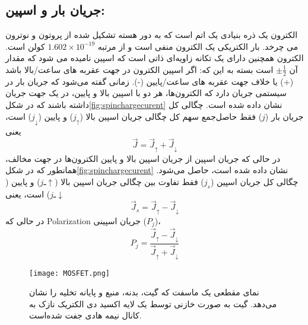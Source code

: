 \subsection{جریان بار و اسپین:}
الکترون یک ذره بنیادی یک اتم است که به دور هسته تشکیل شده از پروتون و نوترون می چرخد. بار الکتریکی یک الکترون منفی است و از مرتبه $1.602\times 10^{-19}$ کولن است. الکترون همچنین دارای یک تکانه زاویه‌ای ذاتی است که اسپین نامیده می شود که مقدار آن $\pm\frac{1}{2}$ است بسته به این که: اگر اسپین الکترون در جهت عقربه های ساعت/بالا باشد (+) یا خلاف جهت عقربه های ساعت/پایین (-). زمانی گفته می‌شود که جریان بار در سیستمی جریان دارد که الکترون‌ها، هر دو با اسپین بالا و پایین، در یک جهت جریان داشته باشند که در شکل\ref{fig:spinchargecurent} نشان داده شده است. چگالی کل جریان بار ($j$) فقط حاصل‌جمع سهم کل چگالی جریان اسپین بالا ($j_{\uparrow}$) و پایین ($j_{\downarrow}$) 
است، یعنی
\begin{equation}
    \vec{J}={\vec{J}}_{\uparrow }+{\vec{J}}_{\downarrow}
\end{equation}
در حالی که جریان اسپین از جریان اسپین بالا و پایین الکترون‌ها در جهت مخالف، همانطور که در شکل\ref{fig:spinchargecurent} نشان داده شده است، حاصل می‌شود. چگالی کل جریان اسپین ($j_s$) فقط تفاوت بین چگالی جریان اسپین بالا ($jـ\uparrow$) و پایین ($jـ\downarrow$) است، یعنی
\begin{equation}
    \vec{J}_{s} = \vec{J}_{\uparrow} - \vec{J}_{\downarrow}
\end{equation}
در حالی که \gls{Polarization} جریان اسپینی ($P_j$)،
\begin{equation}
    P_j = \frac{\vec{J}_{\uparrow} - \vec{J}_{\downarrow}}{\vec{J}_{\uparrow} + \vec{J}_{\downarrow}}
\end{equation}
\begin{figure*}[!ht]
    \centering
    \texttt{[image: MOSFET.png]}
    \caption{نمای مقطعی یک ماسفت که گیت، بدنه، منبع و پایانه تخلیه را نشان می‌دهد. گیت به صورت خازنی توسط یک لایه اکسید دی الکتریک نازک به کانال نیمه هادی جفت شده‌است.}
    \label{fig:mosfet}
\end{figure*}
